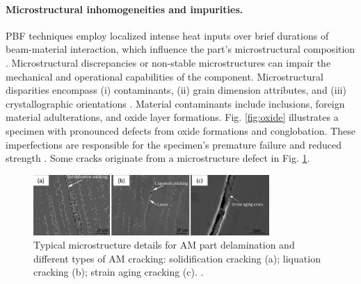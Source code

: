 \paragraph{Microstructural inhomogeneities and impurities.} PBF techniques employ localized intense heat inputs over brief durations of beam-material interaction, which influence the part's microstructural composition \cite{thijs_study_2010}. Microstructural discrepancies or non-stable microstructures can impair the mechanical and operational capabilities of the component. Microstructural disparities encompass (i) contaminants, (ii) grain dimension attributes, and (iii) crystallographic orientations \cite{dr_bree_m_sharratt_non-destructive_2015}. Material contaminants include inclusions, foreign material adulterations, and oxide layer formations. Fig. \ref{fig:oxide} illustrates a specimen with pronounced defects from oxide formations and conglobation. These imperfections are responsible for the specimen's premature failure and reduced strength \cite{casati_microstructure_2016}. Some cracks originate from a microstructure defect in Fig. \ref{fig:microstructuredefect}.
\begin{figure}
    \centering
    \includegraphics[width=0.8\textwidth]{Images/microstructure.png}
    \caption[Microstructure details.]{Typical microstructure details for AM part delamination and different types of AM cracking: solidification cracking (a); liquation cracking (b); strain aging cracking (c). \cite{mostafaei_defects_2022}.}
    \label{fig:microstructuredefect}
\end{figure}
